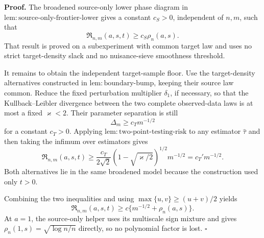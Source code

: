 \textbf{Proof.}
The broadened source-only lower phase diagram in \(\mathrm{lem:source\text{-}only\text{-}frontier\text{-}lower}\) gives a constant \(c_S>0\), independent of \(n,m\), such that
\[
\mathfrak R_{n,m}(a,s,t)\ge c_S\rho_n(a,s).
\]
That result is proved on a subexperiment with common target law and uses no strict target-density slack and no nuisance-sieve smoothness threshold.

It remains to obtain the independent target-sample floor. Use the target-density alternatives constructed in \(\mathrm{lem:boundary\text{-}bump}\), keeping their source law common. Reduce the fixed perturbation multiplier \(\delta_1\), if necessary, so that the Kullback--Leibler divergence between the two complete observed-data laws is at most a fixed \(\varkappa<2\). Their parameter separation is still
\[
\Delta_m\ge c_Tm^{-1/2}
\]
for a constant \(c_T>0\). Applying \(\mathrm{lem:two\text{-}point\text{-}testing\text{-}risk}\) to any estimator \(\widehat\tau\) and then taking the infimum over estimators gives
\[
\mathfrak R_{n,m}(a,s,t)
\ge \frac{c_T}{2\sqrt2}
\left(1-\sqrt{\varkappa/2}\right)^{1/2}m^{-1/2}
=c_T'm^{-1/2}.
\]
Both alternatives lie in the same broadened model because the construction used only \(t>0\).

Combining the two inequalities and using \(\max\{u,v\}\ge(u+v)/2\) yields
\[
\mathfrak R_{n,m}(a,s,t)
\ge c\{m^{-1/2}+\rho_n(a,s)\}.
\]
At \(a=1\), the source-only helper uses its multiscale sign mixture and gives \(\rho_n(1,s)=\sqrt{\log n/n}\) directly, so no polynomial factor is lost. \(\square\)